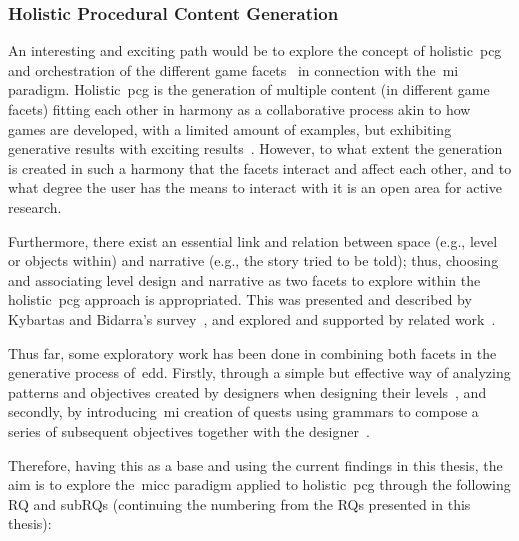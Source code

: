 \subsubsection{Holistic Procedural Content Generation}

An interesting and exciting path would be to explore the concept of holistic~\acrshort{pcg} and orchestration of the different game facets~\cite{Liapis2019-OrchestratingGames} in connection with the~\acrshort{mi} paradigm. Holistic~\acrshort{pcg} is the generation of multiple content (in different game facets) fitting each other in harmony as a collaborative process akin to how games are developed, with a limited amount of examples, but exhibiting generative results with exciting results~\cite{hartsook2011-storyWorlds,Cook2014-ARogueDream,hoover2015-audioinspace,Smith2011-situatingQuests,dormans2011generating}. However, to what extent the generation is created in such a harmony that the facets interact and affect each other, and to what degree the user has the means to interact with it is an open area for active research. 

Furthermore, there exist an essential link and relation between space (e.g., level or objects within) and narrative (e.g., the story tried to be told); thus, choosing and associating level design and narrative as two facets to explore within the holistic~\acrshort{pcg} approach is appropriated. This was presented and described by Kybartas and Bidarra's survey~\cite{kybartas2016survey}, and explored and supported by related work~\cite{aarseth2005hunt,Dehn1981-StoryGen,Lebowitz83-CreatingStorytelling,hartsook2011-storyWorlds,Karavolos2015-miccMissionsLevels,abuzuraiq2019-taksim}.

Thus far, some exploratory work has been done in combining both facets in the generative process of~\acrshort{edd}. Firstly, through a simple but effective way of analyzing patterns and objectives created by designers when designing their levels~\cite{flodtol2020-WIPMakeSenseDungs}, and secondly, by introducing~\acrshort{mi} creation of quests using grammars to compose a series of subsequent objectives together with the designer~\cite{grevols2020-BS}. 

Therefore, having this as a base and using the current findings in this thesis, the aim is to explore the~\acrshort{micc} paradigm applied to holistic~\acrshort{pcg} through the following RQ and subRQs (continuing the numbering from the RQs presented in this thesis): 




